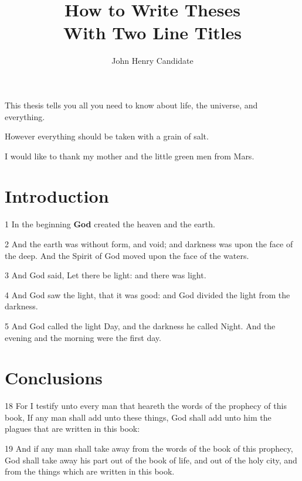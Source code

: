 \documentclass[12pt,twoside]{report}
\begin{document}
    \title{How to Write Theses\\
            With Two Line Titles}
    \author{John Henry Candidate}
 
    \beforepreface
        This thesis tells you all you need to know about life, the
        universe, and everything.

\newpage

However everything should be taken with a grain of salt.


        I would like to thank my mother and the little green men from
        Mars. 

    \afterpreface
 
    \chapter{Introduction}
    
    1 In the beginning {\bfseries God} created the heaven and the earth.
    
    2 And the earth was without form, and void; and darkness was upon
    the face of the deep. And the Spirit of God moved upon the face of
    the waters.
    
    3 And God said, Let there be light: and there was light.
    
    4 And God saw the light, that it was good: and God divided the
    light from the darkness.
    
    5 And God called the light Day, and the darkness he called Night.
    And the evening and the morning were the first day.


    \chapter{Conclusions}

    
    18 For I testify unto every man that heareth the words of the
    prophecy of this book, If any man shall add unto these things, God
    shall add unto him the plagues that are written in this book:
    
    19 And if any man shall take away from the words of the book of
    this prophecy, God shall take away his part out of the book of
    life, and out of the holy city, and from the things which are
    written in this book.
\end{document}
